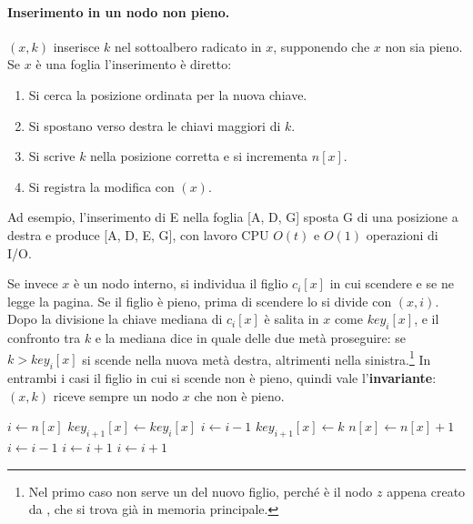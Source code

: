 \paragraph{Inserimento in un nodo non pieno.}
\BTreeInsertNonfull$(x,k)$ inserisce $k$ nel sottoalbero radicato in $x$, supponendo che $x$ non sia pieno. Se $x$ è una foglia l'inserimento è diretto:
\begin{enumerate}
    \item Si cerca la posizione ordinata per la nuova chiave.
    \item Si spostano verso destra le chiavi maggiori di $k$.
    \item Si scrive $k$ nella posizione corretta e si incrementa $n[x]$.
    \item Si registra la modifica con \PageWrite$(x)$.
\end{enumerate}
Ad esempio, l'inserimento di E nella foglia [A, D, G] sposta G di una posizione a destra e produce [A, D, E, G], con lavoro CPU $O(t)$ e $O(1)$ operazioni di I/O.

Se invece $x$ è un nodo interno, si individua il figlio $c_i[x]$ in cui scendere e se ne legge la pagina. Se il figlio è pieno, prima di scendere lo si divide con \BTreeSplitChild$(x,i)$. Dopo la divisione la chiave mediana di $c_i[x]$ è salita in $x$ come $\mathit{key}_i[x]$, e il confronto tra $k$ e la mediana dice in quale delle due metà proseguire: se $k > \mathit{key}_i[x]$ si scende nella nuova metà destra, altrimenti nella sinistra.\footnote{Nel primo caso non serve un \PageRead{} del nuovo figlio, perché è il nodo $z$ appena creato da \BTreeSplitChild{}, che si trova già in memoria principale.} In entrambi i casi il figlio in cui si scende non è pieno, quindi vale l'\textbf{invariante}: \BTreeInsertNonfull$(x,k)$ riceve sempre un nodo $x$ che non è pieno.

\begin{algorithm}[htbp]
\caption{L'inserimento di $k$ nel sottoalbero radicato nel nodo non pieno $x$. Ogni figlio pieno incontrato durante la discesa viene diviso prima di scendere al suo interno.}\label{alg:insert-nonfull}
\begin{algorithmic}[1]
  \State $i \gets n[x]$
      \State $\mathit{key}_{i+1}[x] \gets \mathit{key}_i[x]$
      \State $i \gets i-1$
    \EndWhile
    \State $\mathit{key}_{i+1}[x] \gets k$
    \State $n[x] \gets n[x]+1$
    \State {}
  \Else
      \State $i \gets i-1$
    \EndWhile
    \State $i \gets i+1$
    \State {}
      \State {}
        \State $i \gets i+1$
      \EndIf
    \EndIf
    \State {}
  \EndIf
\EndProcedure
\end{algorithmic}
\end{algorithm}

